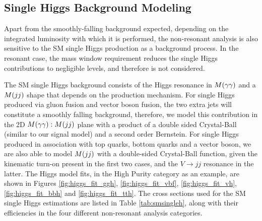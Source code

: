 \subsection{Single Higgs Background Modeling}

Apart from the smoothly-falling background expected, depending on the integrated luminosity with which it is performed, the non-resonant analysis is also sensitive to the SM single Higgs production as a background process. 
In the resonant case, the mass window requirement reduces the single Higgs contributions to negligible levels, and therefore is not considered. 

The SM single Higgs background consists of the Higgs resonance in $M(\gamma\gamma)$ and a $M(jj)$ shape that depends on the production mechanism. 
For single Higgs produced via gluon fusion and vector boson fusion, the two extra jets will constitute a smoothly falling background, therefore, we model this contribution in the 2D $M(\gamma\gamma):M(jj)$ plane with a product of a double sided Crystal-Ball (similar to our signal model)  and a second order Bernstein. 
For single Higgs produced in association with top quarks, bottom quarks and a vector boson, we are also able to model $M(jj)$ with a double-sided Crystal-Ball function, given the kinematic turn-on present in the first two cases, and the $V\rightarrow jj$ resonance in the latter.  
The Higgs model fits, in the High Purity category as an example, are shown in Figures \ref{fig:higgs_fit_ggh}, \ref{fig:higgs_fit_vbf}, \ref{fig:higgs_fit_vh}, \ref{fig:higgs_fit_bbh} and \ref{fig:higgs_fit_tth}.
The cross sections used for the SM single Higgs estimations are listed in Table \ref{tab:smsingleh}, along with their efficiencies in the four different non-resonant analysis categories. 

